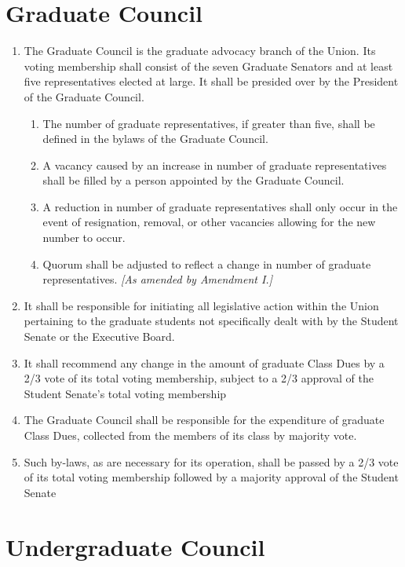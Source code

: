 \documentclass{uniondoc}
\begin{document}
\section{Graduate Council}

\begin{enumerate}
	\item The Graduate Council is the graduate advocacy branch of the Union. Its voting membership shall consist of the seven Graduate Senators and at least five representatives elected at large. It shall be presided over by the President of the Graduate Council.
	      \begin{enumerate}
		      \item The number of graduate representatives, if greater than five, shall be defined in the bylaws of the Graduate Council.
		      \item A vacancy caused by an increase in number of graduate representatives shall be filled by a person appointed by the Graduate Council.
		      \item A reduction in number of graduate representatives shall only occur in the event of resignation, removal, or other vacancies allowing for the new number to occur.
		      \item Quorum shall be adjusted to reflect a change in number of graduate representatives. \textit{[As amended by Amendment I.]}
	      \end{enumerate}
	\item It shall be responsible for initiating all legislative action within the Union pertaining to the graduate students not specifically dealt with by the Student Senate or the Executive Board.
	\item It shall recommend any change in the amount of graduate Class Dues by a 2/3 vote of its total voting membership, subject to a 2/3 approval of the Student Senate's total voting membership
	\item The Graduate Council shall be responsible for the expenditure of graduate Class Dues, collected from the members of its class by majority vote.
	\item Such by-laws, as are necessary for its operation, shall be passed by a 2/3 vote of its total voting membership followed by a majority approval of the Student Senate
\end{enumerate}

\section{Undergraduate Council}
\end{document}
